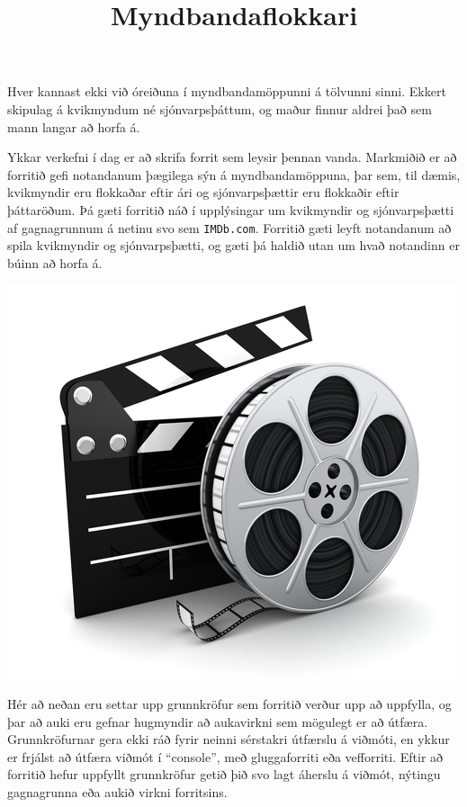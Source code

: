 \documentclass{article}
\title{Myndbandaflokkari}
\author{}
\date{}
\begin{document}
\maketitle

Hver kannast ekki við óreiðuna í myndbandamöppunni á tölvunni sinni. Ekkert
skipulag á kvikmyndum né sjónvarpsþáttum, og maður finnur aldrei það sem mann
langar að horfa á.

Ykkar verkefni í dag er að skrifa forrit sem leysir þennan vanda. Markmiðið er
að forritið gefi notandanum þægilega sýn á myndbandamöppuna, þar sem, til
dæmis, kvikmyndir eru flokkaðar eftir ári og sjónvarpsþættir eru flokkaðir
eftir þáttaröðum. Þá gæti forritið náð í upplýsingar um kvikmyndir og
sjónvarpsþætti af gagnagrunnum á netinu svo sem \texttt{IMDb.com}. Forritið gæti leyft
notandanum að spila kvikmyndir og sjónvarpsþætti, og gæti þá haldið utan um
hvað notandinn er búinn að horfa á.

\vspace{5pt}
\begin{center}
    \includegraphics[scale=1.5]{movie.png}
\end{center}

Hér að neðan eru settar upp grunnkröfur sem forritið verður upp að uppfylla,
og þar að auki eru gefnar hugmyndir að aukavirkni sem mögulegt er að útfæra.
Grunnkröfurnar gera ekki ráð fyrir neinni sérstakri útfærslu á viðmóti, en ykkur
er frjálst að útfæra viðmót í "`console"', með gluggaforriti eða vefforriti.
Eftir að forritið hefur uppfyllt grunnkröfur getið þið svo lagt áherslu á
viðmót, nýtingu gagnagrunna eða aukið virkni forritsins.
\end{document}
